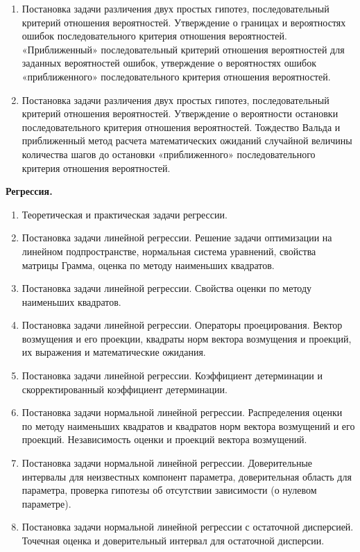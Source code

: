 \documentclass[a4paper,12pt]{article}
\newcommand{\theme}[1]{\hfil \textbf{#1} \hfil}
\begin{document}
\begin{enumerate}[resume]
    \item \label{hyp:dis-pr} Постановка задачи различения двух простых гипотез, последовательный критерий отношения вероятностей. Утверждение о границах и вероятностях ошибок последовательного критерия отношения вероятностей. «Приближенный» последовательный критерий отношения вероятностей для заданных вероятностей ошибок, утверждение о вероятностях ошибок «приближенного» последовательного критерия отношения вероятностей.
    \item \label{hyp:dis-cnt} Постановка задачи различения двух простых гипотез, последовательный критерий отношения вероятностей. Утверждение о вероятности остановки последовательного критерия отношения вероятностей. Тождество Вальда и приближенный метод расчета математических ожиданий случайной величины количества шагов до остановки «приближенного» последовательного критерия отношения вероятностей.
\end{enumerate}

\theme{Регрессия.}
\begin{enumerate}[resume]
    \item \label{reg:tp} Теоретическая и практическая задачи регрессии.
    \item \label{reg:lin:est} Постановка задачи линейной регрессии. Решение задачи оптимизации на линейном подпространстве, нормальная система уравнений, свойства матрицы Грамма, оценка по методу наименьших квадратов.
    \item \label{reg:lin:pro} Постановка задачи линейной регрессии. Свойства оценки по методу наименьших квадратов.
    \item \label{reg:lin:dis} Постановка задачи линейной регрессии. Операторы проецирования. Вектор возмущения и его проекции, квадраты норм вектора возмущения и проекций, их выражения и математические ожидания.
    \item \label{reg:lin:det} Постановка задачи линейной регрессии. Коэффициент детерминации и скорректированный коэффициент детерминации.
    \item \label{reg:nor:dist} Постановка задачи нормальной линейной регрессии. Распределения оценки по методу наименьших квадратов и квадратов норм вектора возмущений и его проекций. Независимость оценки и проекций вектора возмущений.
    \item \label{reg:nor:conf} Постановка задачи нормальной линейной регрессии. Доверительные интервалы для неизвестных компонент параметра, доверительная область для параметра, проверка гипотезы об отсутствии зависимости (о нулевом параметре).
    \item \label{reg:nor:var} Постановка задачи нормальной линейной регрессии с остаточной дисперсией. Точечная оценка и доверительный интервал для остаточной дисперсии.
\end{enumerate}
\end{document}
